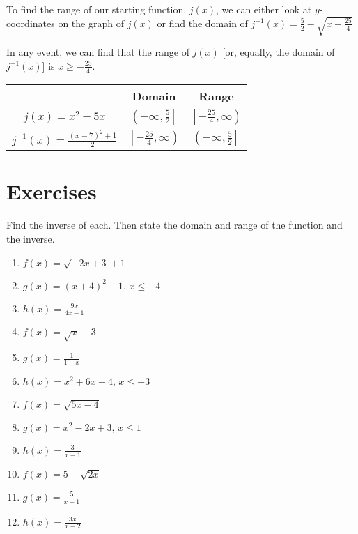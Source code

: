 \begin{solution}
\vspace{0.25in}

To find the range of our starting function, $j(x)$, we can either look at $y$-coordinates on the graph of $j(x)$ or find the domain of $j^{-1}(x) = \frac{5}{2} - \sqrt{x + \frac{25}{4}}$ \newline 

In any event, we can find that the range of $j(x)$ [or, equally, the domain of $j^{-1}(x)$] is $x \geq -\frac{25}{4}$.

\begin{center}
\begin{tabular}{c|c|c}  
     & Domain & Range \\ \hline 
     $j(x)=x^2-5x$ & \cellcolor{yellow} $\left(-\infty, \frac{5}{2}\right]$ & \cellcolor{green} $\left[-\frac{25}{4}, \infty\right)$ \\[4pt] \hline 
     $j^{-1}(x) = \frac{(x-7)^2+1}{2}$ & \cellcolor{green} $\left[-\frac{25}{4}, \infty\right)$ & \cellcolor{yellow} $\left(-\infty, \frac{5}{2}\right]$ \\[4pt]
\end{tabular}
\end{center}

\end{solution}

\section{Exercises}

Find the inverse of each. Then state the domain and range of the function and the inverse.

\begin{enumerate}
	\item $f(x) = \sqrt{-2x + 3} + 1$
	\item $g(x) = (x+4)^2 - 1, \, x \leq -4$
	\item $h(x) = \frac{9x}{4x-1}$
	\item $f(x) = \sqrt{x} - 3$
	\item $g(x) = \frac{1}{1-x}$
	\item $h(x) = x^2 + 6x + 4, \, x \leq -3$
	\item $f(x) = \sqrt{5x-4}$
	\item $g(x) = x^2 - 2x + 3, \, x \leq 1$
	\item $h(x) = \frac{3}{x-1}$
	
	\item $f(x) = 5-\sqrt{2x}$
    \item $g(x) = \frac{5}{x+1}$
    \item $h(x) = \frac{3x}{x-2}$
\end{enumerate}


